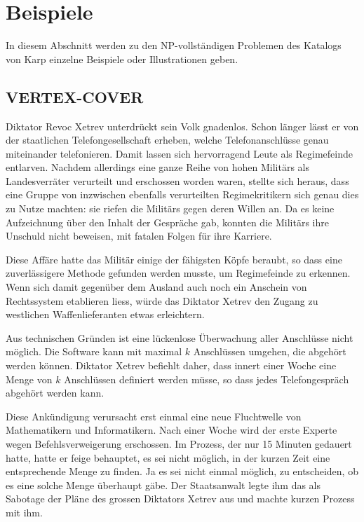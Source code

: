 %
%
%
\section{Beispiele}
In diesem Abschnitt werden zu den NP-vollständigen Problemen des
Katalogs von Karp einzelne Beispiele oder Illustrationen geben.
\subsection{VERTEX-COVER}
Diktator Revoc Xetrev unterdrückt sein Volk gnadenlos.
Schon länger lässt er von der staatlichen Telefongesellschaft
erheben, welche Telefonanschlüsse genau miteinander telefonieren.
Damit lassen sich hervorragend Leute als Regimefeinde entlarven.
Nachdem allerdings eine ganze Reihe von hohen Militärs als
Landesverräter verurteilt und erschossen worden waren,
stellte sich heraus, dass eine Gruppe von
inzwischen ebenfalls verurteilten Regimekritikern sich genau dies
zu Nutze machten: sie riefen die Militärs gegen deren Willen an.
Da es keine Aufzeichnung über den Inhalt der Gespräche gab, konnten
die Militärs ihre Unschuld nicht beweisen, mit fatalen Folgen für
ihre Karriere.

Diese Affäre hatte das Militär einige der fähigsten Köpfe beraubt,
so dass eine zuverlässigere Methode gefunden werden musste, um
Regimefeinde zu erkennen.
Wenn sich damit gegenüber dem Ausland auch noch ein Anschein von
Rechtssystem etablieren liess, würde das Diktator Xetrev den Zugang
zu westlichen Waffenlieferanten etwas erleichtern.

Aus technischen Gründen ist eine lückenlose Überwachung aller Anschlüsse
nicht möglich.
Die Software kann mit maximal $k$ Anschlüssen umgehen, die abgehört
werden können.
Diktator Xetrev befiehlt daher, dass innert einer Woche eine Menge
von $k$ Anschlüssen definiert werden müsse, so dass jedes
Telefongespräch abgehört werden kann.

Diese Ankündigung verursacht erst einmal eine neue Fluchtwelle von
Mathematikern und Informatikern.
Nach einer Woche wird der erste Experte wegen Befehlsverweigerung
erschossen.
Im Prozess, der nur 15 Minuten gedauert hatte, hatte er feige behauptet,
es sei nicht möglich, in der kurzen
Zeit eine entsprechende Menge zu finden.
Ja es sei nicht einmal
möglich, zu entscheiden, ob es eine solche Menge überhaupt gäbe.
Der Staatsanwalt legte ihm das als Sabotage der Pläne des grossen
Diktators Xetrev aus und machte kurzen Prozess mit ihm.

